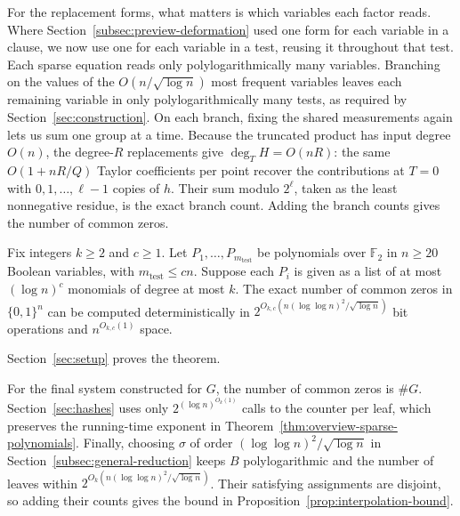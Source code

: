 For the replacement forms, what matters is which variables each factor
reads. Where Section~\ref{subsec:preview-deformation} used one form
for each variable in a clause, we now use one for each variable in a
test, reusing it throughout that test. Each sparse equation reads only
polylogarithmically many variables. Branching on the values of the
$O(n/\sqrt{\log n})$ most frequent variables leaves each remaining
variable in only polylogarithmically many tests, as required by
Section~\ref{sec:construction}. On each branch, fixing the shared
measurements again lets us sum one group at a time. Because the
truncated product has input degree $O(n)$, the degree-$R$ replacements
give $\deg_T H=O(nR)$: the same $O(1+nR/Q)$ Taylor coefficients per
point recover the contributions at $T=0$ with $0,1,\ldots,\ell-1$
copies of $h$. Their sum modulo $2^\ell$, taken as the least nonnegative
residue, is the exact branch count. Adding the branch counts gives the
number of common zeros.

\begin{theorem}
\label{thm:overview-sparse-polynomials}
Fix integers $k\ge2$ and $c\ge1$. Let $P_1,\ldots,P_{m_{\mathrm{test}}}$ be polynomials
over $\mathbb F_2$ in $n\ge20$ Boolean variables, with $m_{\mathrm{test}}\le cn$.
Suppose each $P_i$ is given as a list of at most $(\log n)^c$
monomials of degree at most $k$. The exact number of common zeros in
$\{0,1\}^n$ can be computed deterministically in
$2^{O_{k,c}(n(\log\log n)^2/\sqrt{\log n})}$ bit operations and
$n^{O_{k,c}(1)}$ space.
\end{theorem}
Section~\ref{sec:setup} proves the theorem.

For the final system constructed for $G$, the number of common zeros is $\#G$.
Section~\ref{sec:hashes} uses only $2^{(\log n)^{O_k(1)}}$ calls
to the counter per leaf, which preserves the running-time exponent in
Theorem~\ref{thm:overview-sparse-polynomials}. Finally, choosing
$\sigma$ of order $(\log\log n)^2/\sqrt{\log n}$ in
Section~\ref{subsec:general-reduction} keeps $B$ polylogarithmic
and the number of leaves within $2^{O_k(n(\log\log n)^2/\sqrt{\log n})}$.
Their satisfying assignments are disjoint, so adding their counts
gives the bound in Proposition~\ref{prop:interpolation-bound}.

